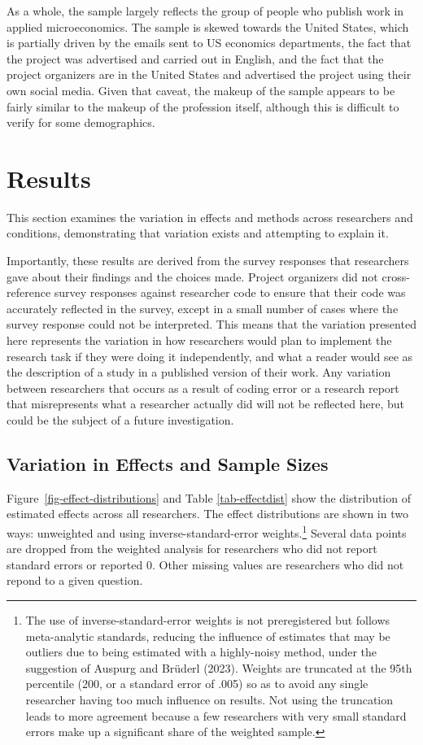 \documentclass[
  letterpaper,
  DIV=11,
  numbers=noendperiod]{scrartcl}
\begin{document}
As a whole, the sample largely reflects the group of people who publish
work in applied microeconomics. The sample is skewed towards the United
States, which is partially driven by the emails sent to US economics
departments, the fact that the project was advertised and carried out in
English, and the fact that the project organizers are in the United
States and advertised the project using their own social media. Given
that caveat, the makeup of the sample appears to be fairly similar to
the makeup of the profession itself, although this is difficult to
verify for some demographics.

\hypertarget{results}{%
\section{Results}\label{results}}

This section examines the variation in effects and methods across
researchers and conditions, demonstrating that variation exists and
attempting to explain it.

Importantly, these results are derived from the survey responses that
researchers gave about their findings and the choices made. Project
organizers did not cross-reference survey responses against researcher
code to ensure that their code was accurately reflected in the survey,
except in a small number of cases where the survey response could not be
interpreted. This means that the variation presented here represents the
variation in how researchers would plan to implement the research task
if they were doing it independently, and what a reader would see as the
description of a study in a published version of their work. Any
variation between researchers that occurs as a result of coding error or
a research report that misrepresents what a researcher actually did will
not be reflected here, but could be the subject of a future
investigation.

\hypertarget{sec-variation}{%
\subsection{Variation in Effects and Sample Sizes}\label{sec-variation}}

Figure~\ref{fig-effect-distributions} and Table \ref{tab-effectdist}
show the distribution of estimated effects across all researchers. The
effect distributions are shown in two ways: unweighted and using
inverse-standard-error weights.\footnote{The use of
  inverse-standard-error weights is not preregistered but follows
  meta-analytic standards, reducing the influence of estimates that may
  be outliers due to being estimated with a highly-noisy method, under
  the suggestion of Auspurg and Brüderl (2023). Weights are truncated at
  the 95th percentile (200, or a standard error of .005) so as to avoid
  any single researcher having too much influence on results. Not using
  the truncation leads to more agreement because a few researchers with
  very small standard errors make up a significant share of the weighted
  sample.} Several data points are dropped from the weighted analysis
for researchers who did not report standard errors or reported 0. Other
missing values are researchers who did not repond to a given question.
\end{document}
